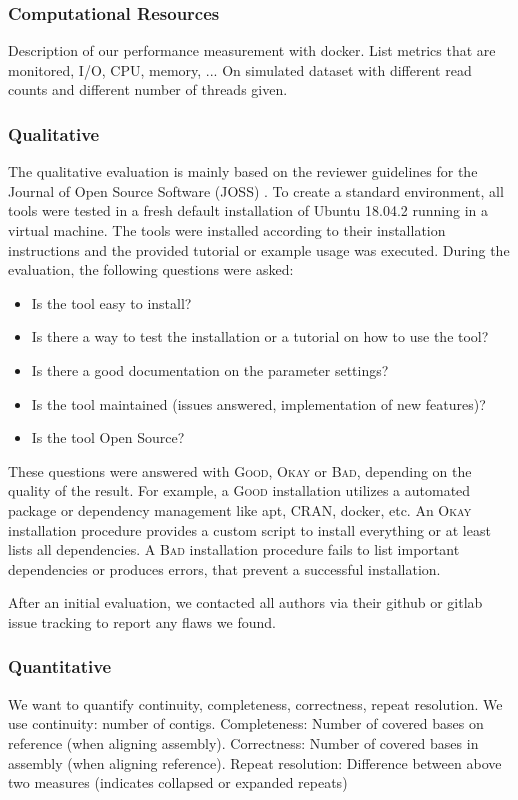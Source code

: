 \documentclass{bmcart}
\newcommand{\ok}{\textsc{Okay}}
\newcommand{\bad}{\textsc{Bad}}
\newcommand{\good}{\textsc{Good}}
\begin{document}
\subsubsection*{Computational Resources}
Description of our performance measurement with docker. List metrics that are monitored, I/O, CPU, memory, ...
On simulated dataset with different read counts and different number of threads given.

\subsubsection*{Qualitative}

The qualitative evaluation is mainly based on the reviewer guidelines for the Journal of Open Source Software (JOSS) \cite{joss}.
To create a standard environment, all tools were tested in a fresh default installation of Ubuntu 18.04.2 running in a virtual machine. The tools were installed according to their installation instructions and
the provided tutorial or example usage was executed. During the evaluation, the following
questions were asked:

\begin{itemize}
    \item Is the tool easy to install? 
    \item Is there a way to test the installation or a tutorial on how to use the tool? 
    \item Is there a good documentation on the parameter settings? 
    \item Is the tool maintained (issues answered, implementation of new features)? 
    \item Is the tool Open Source?
\end{itemize}

These questions were answered with \good{}, \ok{} or \bad{}, depending on the quality of the result. 
For example, a \good{} installation utilizes a automated package or dependency management like apt,
CRAN, docker, etc. An \ok{} installation procedure provides a custom script to install everything
or at least lists all dependencies. A \bad{} installation procedure fails to list important dependencies
or produces errors, that prevent a successful installation. 

After an initial evaluation, we contacted all authors via their github or gitlab issue tracking to
report any flaws we found.

\subsubsection*{Quantitative}
We want to quantify continuity, completeness, correctness, repeat resolution.
We use continuity: number of contigs.
Completeness: Number of covered bases on reference (when aligning assembly).
Correctness: Number of covered bases in assembly (when aligning reference).
Repeat resolution: Difference between above two measures (indicates collapsed or expanded repeats)
%
\end{document}
